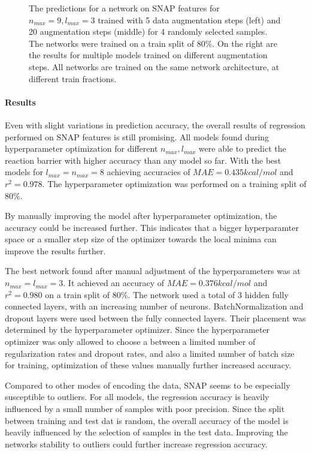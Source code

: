\begin{figure}[!htb]
  \endminipage\hfill
  \caption{
  The predictions for a network on SNAP features for $n_{max}=9, l_{max}=3$ trained with 5 data augmentation steps (left) 
  and 20 augmentation steps (middle) for 4 randomly selected samples. 
  The networks were trained on a train split of 80\%.
  On the right are the results for multiple models trained on different augmentation steps.
  All networks are trained on the same network architecture, at different train fractions.
  }
  \label{fig:snap_roation}
\end{figure}


\paragraph{Results}

Even with slight variations in prediction accuracy, the overall results of regression performed on SNAP features is still promising.
All models found during hyperparameter optimization for different $n_{max}, l_{max}$ were able to predict the reaction barrier with higher accuracy than any model so far.
With the best models for $l_{max}=n_{max}=8$ achieving accuracies of $MAE=0.435 kcal/mol$ and $r^2=0.978$.
The hyperparameter optimization was performed on a training split of 80\%.

By manually improving the model after hyperparameter optimization, the accuracy could be increased further.
This indicates that a bigger hyperparamter space or a smaller step size of the optimizer towards the local minima can 
improve the results further.

The best network found after manual adjustment of the hyperparameters was at $n_{max}=l_{max}=3$.
It achieved an accuracy of $MAE=0.376 kcal/mol$ and $r^2=0.980$ on a train split of 80\%.
The network used a total of 3 hidden fully connected layers, with an increasing number of neurons.
BatchNormalization and dropout layers were used between the fully connected layers.
Their placement was determined by the hyperparameter optimizer.
Since the hyperparameter optimizer was only allowed to choose a between a limited number 
of regularization rates and dropout rates, and also a limited number of batch size for training,
optimization of these values manually further increased accuracy.

Compared to other modes of encoding the data, SNAP seems to be especially susceptible to outliers.
For all models, the regression accuracy is heavily influenced by a small number of samples with poor precision.
Since the split between training and test dat is random, the overall accuracy of the model is 
heavily influenced by the selection of samples in the test data.
Improving the networks stability to outliers could further increase regression accuracy.


